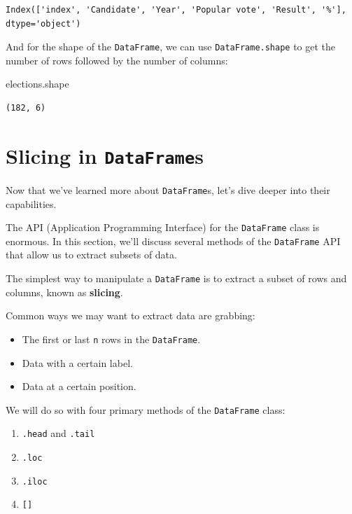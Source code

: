 \documentclass[
  letterpaper,
  DIV=11,
  numbers=noendperiod]{scrreprt}
\newenvironment{Shaded}{\begin{snugshade}}{\end{snugshade}}
\newcommand{\NormalTok}[1]{\textcolor[rgb]{0.00,0.23,0.31}{#1}}
\providecommand{\tightlist}{%
  \setlength{\itemsep}{0pt}\setlength{\parskip}{0pt}}\usepackage{longtable,booktabs,array}
\begin{document}
\begin{verbatim}
Index(['index', 'Candidate', 'Year', 'Popular vote', 'Result', '%'], dtype='object')
\end{verbatim}

And for the shape of the \texttt{DataFrame}, we can use
\texttt{DataFrame.shape} to get the number of rows followed by the
number of columns:

\begin{Shaded}
\begin{Highlighting}[]
\NormalTok{elections.shape}
\end{Highlighting}
\end{Shaded}

\begin{verbatim}
(182, 6)
\end{verbatim}

\hypertarget{slicing-in-dataframes}{%
\section{\texorpdfstring{Slicing in
\texttt{DataFrame}s}{Slicing in DataFrames}}\label{slicing-in-dataframes}}

Now that we've learned more about \texttt{DataFrame}s, let's dive deeper
into their capabilities.

The API (Application Programming Interface) for the \texttt{DataFrame}
class is enormous. In this section, we'll discuss several methods of the
\texttt{DataFrame} API that allow us to extract subsets of data.

The simplest way to manipulate a \texttt{DataFrame} is to extract a
subset of rows and columns, known as \textbf{slicing}.

Common ways we may want to extract data are grabbing:

\begin{itemize}
\tightlist
\item
  The first or last \texttt{n} rows in the \texttt{DataFrame}.
\item
  Data with a certain label.
\item
  Data at a certain position.
\end{itemize}

We will do so with four primary methods of the \texttt{DataFrame} class:

\begin{enumerate}
\def\labelenumi{\arabic{enumi}.}
\tightlist
\item
  \texttt{.head} and \texttt{.tail}
\item
  \texttt{.loc}
\item
  \texttt{.iloc}
\item
  \texttt{{[}{]}}
\end{enumerate}
\end{document}
